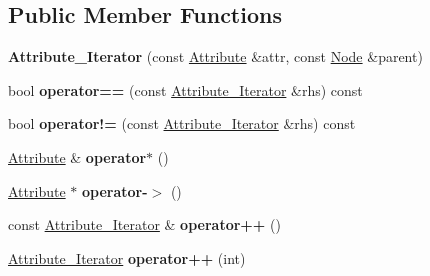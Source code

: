 \subsection*{Public Member Functions}
\begin{DoxyCompactItemize}
\item 
\hypertarget{classphys_1_1xml_1_1Attribute__Iterator_a6d41d41c292dc3863a64870d94c8e7cb}{
{\bfseries Attribute\_\-Iterator} (const \hyperlink{classphys_1_1xml_1_1Attribute}{Attribute} \&attr, const \hyperlink{classphys_1_1xml_1_1Node}{Node} \&parent)}
\label{da/d4f/classphys_1_1xml_1_1Attribute__Iterator_a6d41d41c292dc3863a64870d94c8e7cb}

\item 
\hypertarget{classphys_1_1xml_1_1Attribute__Iterator_a59c9b7f1dd8aa22d88979e7a7c52e26f}{
bool {\bfseries operator==} (const \hyperlink{classphys_1_1xml_1_1Attribute__Iterator}{Attribute\_\-Iterator} \&rhs) const }
\label{da/d4f/classphys_1_1xml_1_1Attribute__Iterator_a59c9b7f1dd8aa22d88979e7a7c52e26f}

\item 
\hypertarget{classphys_1_1xml_1_1Attribute__Iterator_a786231675867034c467ee8f4c160e34b}{
bool {\bfseries operator!=} (const \hyperlink{classphys_1_1xml_1_1Attribute__Iterator}{Attribute\_\-Iterator} \&rhs) const }
\label{da/d4f/classphys_1_1xml_1_1Attribute__Iterator_a786231675867034c467ee8f4c160e34b}

\item 
\hypertarget{classphys_1_1xml_1_1Attribute__Iterator_a8758629c25d4158271bb5a46cef3c6f4}{
\hyperlink{classphys_1_1xml_1_1Attribute}{Attribute} \& {\bfseries operator$\ast$} ()}
\label{da/d4f/classphys_1_1xml_1_1Attribute__Iterator_a8758629c25d4158271bb5a46cef3c6f4}

\item 
\hypertarget{classphys_1_1xml_1_1Attribute__Iterator_a7b6b804f6db36337212c4cc8bc8688cb}{
\hyperlink{classphys_1_1xml_1_1Attribute}{Attribute} $\ast$ {\bfseries operator-\/$>$} ()}
\label{da/d4f/classphys_1_1xml_1_1Attribute__Iterator_a7b6b804f6db36337212c4cc8bc8688cb}

\item 
\hypertarget{classphys_1_1xml_1_1Attribute__Iterator_a170c1fe062333ba66954de06c3d24c64}{
const \hyperlink{classphys_1_1xml_1_1Attribute__Iterator}{Attribute\_\-Iterator} \& {\bfseries operator++} ()}
\label{da/d4f/classphys_1_1xml_1_1Attribute__Iterator_a170c1fe062333ba66954de06c3d24c64}

\item 
\hypertarget{classphys_1_1xml_1_1Attribute__Iterator_a1dceca79e23b18dc1e7e8f919836cde1}{
\hyperlink{classphys_1_1xml_1_1Attribute__Iterator}{Attribute\_\-Iterator} {\bfseries operator++} (int)}
\label{da/d4f/classphys_1_1xml_1_1Attribute__Iterator_a1dceca79e23b18dc1e7e8f919836cde1}


\end{DoxyCompactItemize}
